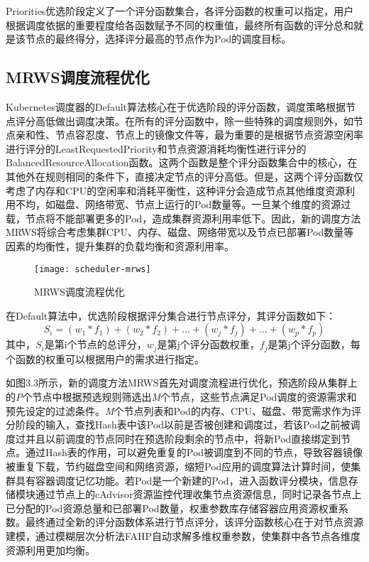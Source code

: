 Priorities优选阶段定义了一个评分函数集合，各评分函数的权重可以指定，用户根据调度依据的重要程度给各函数赋予不同的权重值，最终所有函数的评分总和就是该节点的最终得分，选择评分最高的节点作为Pod的调度目标。

\subsection{MRWS调度流程优化}
Kubernetes调度器的Default算法核心在于优选阶段的评分函数，调度策略根据节点评分高低做出调度决策。在所有的评分函数中，除一些特殊的调度规则外，如节点亲和性、节点容忍度、节点上的镜像文件等，最为重要的是根据节点资源空闲率进行评分的LeastRequestedPriority和节点资源消耗均衡性进行评分的BalancedResourceAllocation函数。这两个函数是整个评分函数集合中的核心，在其他外在规则相同的条件下，直接决定节点的评分高低。但是，这两个评分函数仅考虑了内存和CPU的空闲率和消耗平衡性，这种评分会造成节点其他维度资源利用不均，如磁盘、网络带宽、节点上运行的Pod数量等。一旦某个维度的资源过载，节点将不能部署更多的Pod，造成集群资源利用率低下。因此，新的调度方法MRWS将综合考虑集群CPU、内存、磁盘、网络带宽以及节点已部署Pod数量等因素的均衡性，提升集群的负载均衡和资源利用率。
\begin{figure}[H] %
	\centering
	\texttt{[image: scheduler-mrws]}
	\caption{MRWS调度流程优化}
\end{figure}
在Default算法中，优选阶段根据评分集合进行节点评分，其评分函数如下：
\begin{equation}
	S_{i} = (w_{1}*f_{1})+(w_{2}*f_{2})+...+(w_{j}*f_{j})+...+(w_{p}*f_{p})
\end{equation}
其中，\begin{math}S_{i}\end{math}是第i个节点的总评分，\begin{math}w_{j}\end{math}是第j个评分函数权重，\begin{math}f_{j}\end{math}是第j个评分函数，每个函数的权重可以根据用户的需求进行指定。

如图3.3所示，新的调度方法MRWS首先对调度流程进行优化，预选阶段从集群上的\emph{P}个节点中根据预选规则筛选出\emph{M}个节点，这些节点满足Pod调度的资源需求和预先设定的过滤条件。\emph{M}个节点列表和Pod的内存、CPU、磁盘、带宽需求作为评分阶段的输入，查找Hash表中该Pod以前是否被创建和调度过，若该Pod之前被调度过并且以前调度的节点同时在预选阶段剩余的节点中，将新Pod直接绑定到节点。通过Hash表的作用，可以避免重复的Pod被调度到不同的节点，导致容器镜像被重复下载，节约磁盘空间和网络资源，缩短Pod应用的调度算法计算时间，使集群具有容器调度记忆功能。若Pod是一个新建的Pod，进入函数评分模块，信息存储模块通过节点上的cAdvisor资源监控代理收集节点资源信息，同时记录各节点上已分配的Pod资源总量和已部署Pod数量，权重参数库存储容器应用资源权重系数。最终通过全新的评分函数体系进行节点评分，该评分函数核心在于对节点资源建模，通过模糊层次分析法FAHP自动求解多维权重参数，使集群中各节点各维度资源利用更加均衡。

